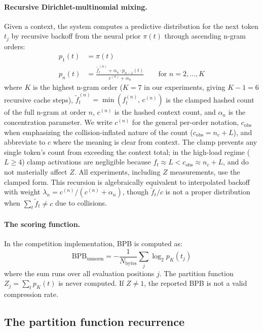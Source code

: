\documentclass[11pt]{article}
\newcommand{\bpb}{\text{BPB}}
\begin{document}
\paragraph{Recursive Dirichlet-multinomial mixing.} Given a context, the system computes a predictive distribution for the next token $t_j$ by recursive backoff from the neural prior $\pi(t)$ through ascending n-gram orders:
\begin{align}
p_1(t) &= \pi(t) \label{eq:base} \\
p_n(t) &= \frac{\tilde{f}_t^{(n)} + \alpha_n \cdot p_{n-1}(t)}{c^{(n)} + \alpha_n} \qquad \text{for } n = 2, \ldots, K \label{eq:recursion}
\end{align}
where $K$ is the highest n-gram order ($K = 7$ in our experiments, giving $K - 1 = 6$ recursive cache steps), $\tilde{f}_t^{(n)} = \min(f_t^{(n)},\, c^{(n)})$ is the clamped hashed count of the full n-gram at order $n$, $c^{(n)}$ is the hashed context count, and $\alpha_n$ is the concentration parameter. We write $c^{(n)}$ for the general per-order notation, $c_{\text{obs}}$ when emphasizing the collision-inflated nature of the count ($c_{\text{obs}} = n_c + L$), and abbreviate to $c$ where the meaning is clear from context. The clamp prevents any single token's count from exceeding the context total; in the high-load regime ($L \geq 4$) clamp activations are negligible because $f_t \approx L < c_{\text{obs}} \approx n_c + L$, and do not materially affect $Z$. All experiments, including $Z$ measurements, use the clamped form. This recursion is algebraically equivalent to interpolated backoff with weight $\lambda_n = c^{(n)}/(c^{(n)} + \alpha_n)$, though $\tilde{f}_t/c$ is not a proper distribution when $\sum_t \tilde{f}_t \neq c$ due to collisions.

\paragraph{The scoring function.} In the competition implementation, BPB is computed as:
\[
\bpb_{\text{unnorm}} = -\frac{1}{N_{\text{bytes}}} \sum_j \log_2 p_K(t_j)
\]
where the sum runs over all evaluation positions $j$. The partition function $Z_j = \sum_t p_K(t)$ is never computed. If $Z \neq 1$, the reported BPB is not a valid compression rate.

\subsection{The partition function recurrence}
\end{document}
